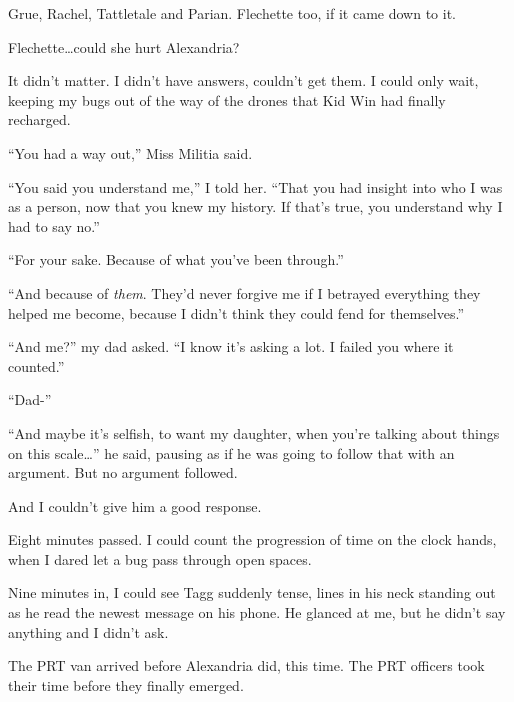 Grue, Rachel, Tattletale and Parian.  Flechette too, if it came down to it.



Flechette\ldots could she hurt Alexandria?



It didn't matter.  I didn't have answers, couldn't get them.  I could only wait, keeping my bugs out of the way of the drones that Kid Win had finally recharged.



``You had a way out,'' Miss Militia said.



``You said you understand me,'' I told her.  ``That you had insight into who I was as a person, now that you knew my history.  If that's true, you understand why I had to say no.''



``For your sake.  Because of what you've been through.''



``And because of \emph{them}.  They'd never forgive me if I betrayed everything they helped me become, because I didn't think they could fend for themselves.''



``And me?'' my dad asked.  ``I know it's asking a lot.  I failed you where it counted.''



``Dad-''



``And maybe it's selfish, to want my daughter, when you're talking about things on this scale\ldots'' he said, pausing as if he was going to follow that with an argument.  But no argument followed.



And I couldn't give him a good response.



Eight minutes passed.  I could count the progression of time on the clock hands, when I dared let a bug pass through open spaces.



Nine minutes in, I could see Tagg suddenly tense, lines in his neck standing out as he read the newest message on his phone.  He glanced at me, but he didn't say anything and I didn't ask.



The PRT van arrived before Alexandria did, this time.  The PRT officers took their time before they finally emerged.



